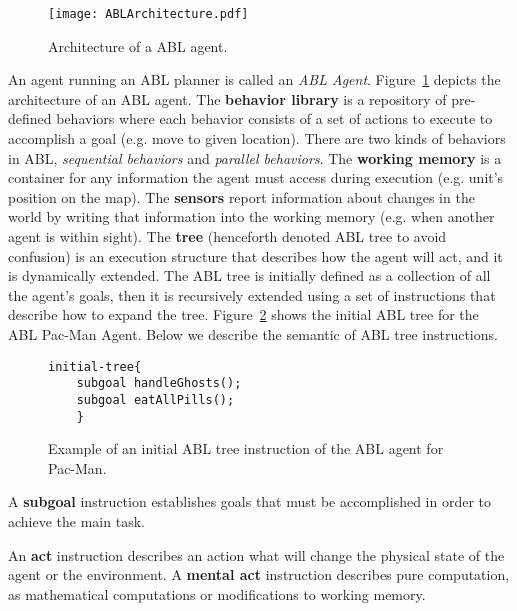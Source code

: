 \begin{figure}[h]
\centering
\texttt{[image: ABLArchitecture.pdf]}
\caption{Architecture of a ABL agent.}
\label{planning:rt.fig.ablarchitecture}
\end{figure}

An agent running an ABL planner is called an \emph{ABL Agent}. Figure~\ref{planning:rt.fig.ablarchitecture} depicts the architecture of an ABL agent. The \textbf{behavior library} is a repository of pre-defined behaviors where each behavior consists of a set of actions to execute to accomplish a goal (e.g. move to given location). There are two kinds of behaviors in ABL, \emph{sequential behaviors} and \emph{parallel behaviors}.
The \textbf{working memory} is a container for any information the agent must access during execution (e.g. unit's position on the map). The \textbf{sensors} report information about changes in
the world by writing that information into the working memory (e.g. when another agent is within sight). The \textbf{tree} (henceforth denoted ABL tree to avoid confusion) is an execution structure that describes how the agent will act, and it is dynamically extended. The ABL tree is initially defined as a collection of all the agent's goals, then it is recursively extended using a set of instructions that describe how to expand the tree.  Figure~\ref{planning:abl.fig.abtintro1} shows the initial ABL tree for the ABL Pac-Man Agent. Below we describe the semantic of  ABL tree instructions.



\begin{figure}[h]
\centering
\begin{lstlisting}
initial-tree{
	subgoal handleGhosts();
	subgoal eatAllPills();
	}
\end{lstlisting}
\caption{Example of an initial ABL tree instruction of the ABL agent for Pac-Man.}
\label{planning:abl.fig.abtintro1}
\end{figure}

A \textbf{subgoal} instruction establishes goals that must be accomplished in order to achieve
the main task.


An \textbf{act} instruction describes an action what will change the physical state of the agent or the environment.
A \textbf{mental act} instruction describes pure computation, as mathematical
computations or modifications to working memory. 


